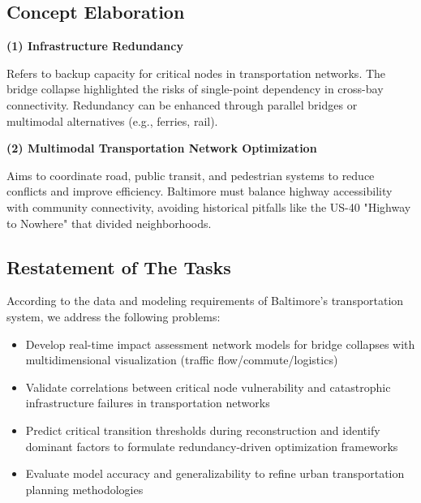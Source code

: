 \documentclass{mcmthesis}
\begin{document}
\subsection{Concept Elaboration}

\textbf{(1) Infrastructure Redundancy}

Refers to backup capacity for critical nodes in transportation networks\cite{farahani2013review}. The bridge collapse highlighted the risks of single-point dependency in cross-bay connectivity. Redundancy can be enhanced through parallel bridges or multimodal alternatives (e.g., ferries, rail).

\textbf{(2) Multimodal Transportation Network Optimization}

Aims to coordinate road, public transit, and pedestrian systems to reduce conflicts and improve efficiency. Baltimore must balance highway accessibility with community connectivity, avoiding historical pitfalls like the US-40 "Highway to Nowhere" that divided neighborhoods.



\subsection{Restatement of The Tasks}

According to the data and modeling requirements of Baltimore's transportation system, we address the following problems:
\vspace{-2.9mm}
\begin{itemize}
    \item Develop real-time impact assessment network models for bridge collapses with multidimensional visualization (traffic flow/commute/logistics)

    \item Validate correlations between critical node vulnerability and catastrophic infrastructure failures in transportation networks\cite{ji2012spatial}

    \item Predict critical transition thresholds during reconstruction and identify dominant factors to formulate redundancy-driven optimization frameworks

    \item Evaluate model accuracy and generalizability to refine urban transportation planning methodologies
\end{itemize}
\vspace{-2.9mm}
\end{document}
